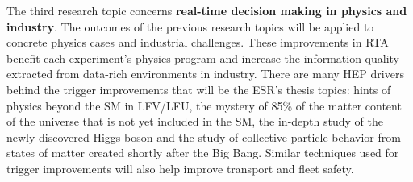 The third research topic concerns \textbf{real-time decision making in physics and industry}. 
The outcomes of the previous research topics will be applied to concrete physics cases and industrial challenges. 
These improvements in RTA benefit each experiment's physics program and increase the information quality extracted from data-rich environments in industry.  
There are many HEP drivers behind the trigger improvements that will be the \acronym ESR's thesis topics: hints of physics beyond the SM in LFV/LFU, the mystery of 85\% of the matter content of the universe that is not yet included in the SM, the in-depth study of the newly discovered Higgs boson and the study of collective particle behavior from states of matter created shortly after the Big Bang. Similar techniques used for trigger improvements will also help improve transport and fleet safety. 
\begin{center}
\vskip-15pt
\end{center}

